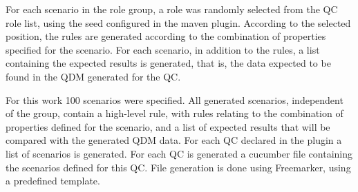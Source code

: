 \documentclass[twocolumn]{bmcart}%
\begin{document}

For each scenario in the role group, a role was randomly selected from the QC role list, using the seed configured in the maven plugin. According to the selected position, the rules are generated according to the combination of properties specified for the scenario. For each scenario, in addition to the rules, a list containing the expected results is generated, that is, the data expected to be found in the QDM generated for the QC.


For this work 100 scenarios were specified. All generated scenarios, independent of the group, contain a high-level rule, with rules relating to the combination of properties defined for the scenario, and a list of expected results that will be compared with the generated QDM data. For each QC declared in the plugin a list of scenarios is generated. For each QC is generated a cucumber file containing the scenarios defined for this QC. File generation is done using Freemarker, using a predefined template.

\end{document}
